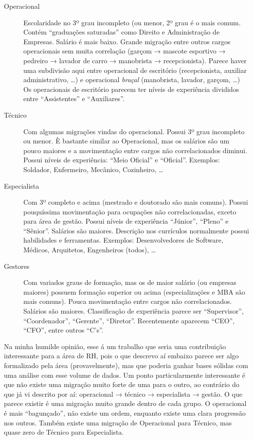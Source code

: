 \documentclass[12pt,a4paper]{article}
\theoremstyle{hypo}
\begin{document}
\begin{description}
\item [Operacional] Escolaridade no 3º grau incompleto (ou menor, 2º grau é o mais comum. Contém \enquote{graduações saturadas} como Direito e Administração de Empresas. Salário é mais baixo. Grande migração entre outros cargos operacionais sem muita correlação (garçom → mascote esportivo → pedreiro → lavador de carro → manobrista → recepcionista). Parece haver uma subdivisão aqui entre operacional de escritório (recepcionista, auxiliar administrativo, \ldots) e operacional \textit{braçal} (manobrista, lavador, garçom, \ldots) Os operacionais de escritório parecem ter níveis de experiência divididos entre \enquote{Assistentes} e \enquote{Auxiliares}.
\item [Técnico] Com algumas migrações vindas do operacional. Possui 3º grau incompleto ou menor. È bastante similar ao Operacional, mas os salários são um pouco maiores e a movimentação entre cargos não correlacionados diminui. Possui níveis de experiência: \enquote{Meio Oficial} e \enquote{Oficial}. Exemplos: Soldador, Enfermeiro, Mecânico, Cozinheiro, \ldots
\item [Especialista] Com 3º completo e acima (mestrado e doutorado são mais comuns). Possui pouquíssima movimentação para ocupações não correlacionadas, exceto para área de gestão. Possui níveis de experiência \enquote{Júnior}, \enquote{Pleno} e \enquote{Sênior}. Salários são maiores. Descrição nos currículos normalmente possui habilidades e ferramentas. Exemplos: Desenvolvedores de Software, Médicos, Arquitetos, Engenheiros (todos), \ldots
\item [Gestores] Com variados graus de formação, mas os de maior salário (ou empresas maiores) possuem formação superior ou acima (especializações e MBA são mais comuns). Pouca movimentação entre cargos não correlacionados. Salários são maiores. Classificação de experiência parece ser \enquote{Supervisor}, \enquote{Coordenador}, \enquote{Gerente}, \enquote{Diretor}. Recentemente aparecem \enquote{CEO}, \enquote{CFO}, entre outros \enquote{C's}.
\end{description}

Na minha humilde opinião, esse á um trabalho que seria uma contribuição interessante para a área de RH, pois o que descrevo aí embaixo parece ser algo formalizado pela área (provavelmente), mas que poderia ganhar bases sólidas com uma análise com esse volume de dados. Um ponto particularmente interessante é que não existe uma migração muito forte de uma para o outro, ao contrário do que já vi descrito por aí: operacional → técnico → especialista → gestão. O que parece existir é uma migração muito grande dentro de cada grupo. O operacional é mais \enquote{bagunçado}, não existe um ordem, enquanto existe uma clara progressão nos outros. Também existe uma migração de Operacional para Técnico, mas quase zero de Técnico para Especialista.
\end{document}
